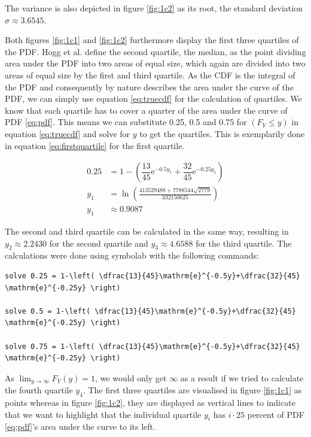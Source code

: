The variance is also depicted in figure \eqref{fig:1c2}     as its root, the standard deviation $\sigma \approx 3.6545$. 

Both figures \eqref{fig:1c1} and \eqref{fig:1c2} furthermore display the first three quartiles of the PDF. Hogg et al. \cite[Chapter~1.7.1]{hogg} define the second quartile, the median, as the point dividing area under the PDF into two areas of equal size, which again are divided into two areas of equal size by the first and third quartile. As the CDF is the integral of the PDF and consequently by nature describes the area under the curve of the PDF, we can simply use equation \eqref{eq:truecdf} for the calculation of quartiles. We know that each quartile has to cover a quarter of the area under the curve of PDF \eqref{eq:pdf}. This means we can substitute 0.25, 0.5 and 0.75 for $(F_Y \leq y)$ in equation \eqref{eq:truecdf} and solve for $y$ to get the quartiles. This is exemplarily done in equation \eqref{eq:firstquartile} for the first quartile.

\begin{equation}
\begin{split}
0.25 &
=1-\left( \dfrac{13}{45}\mathrm{e}^{-0.5y_1} + \dfrac{32}{45}\mathrm{e}^{-0.25y_1} \right)\\
y_1&=\ln \left(\frac{413529488+7788544\sqrt{2779}}{332150625}\right)\\
y_1 &\approx 0.9087 
\end{split}
\label{eq:firstquartile}
\end{equation}

The second and third quartile can be calculated in the same way, resulting in $y_2 \approx 2.2430$ for the second quartile and $y_3 \approx 4.6588$ for the third quartile. The calculations were done using symbolab \cite{symbolab} with the following commands:
\begin{lstlisting}
solve 0.25 = 1-\left( \dfrac{13}{45}\mathrm{e}^{-0.5y}+\dfrac{32}{45}
\mathrm{e}^{-0.25y} \right)

solve 0.5 = 1-\left( \dfrac{13}{45}\mathrm{e}^{-0.5y}+\dfrac{32}{45}
\mathrm{e}^{-0.25y} \right)

solve 0.75 = 1-\left( \dfrac{13}{45}\mathrm{e}^{-0.5y}+\dfrac{32}{45}
\mathrm{e}^{-0.25y} \right)
\end{lstlisting}

As $\lim_{y\to\infty} F_Y(y)= 1$, we would only get $\infty$ as a result if we tried to calculate the fourth quartile $y_4$. The first three quartiles are visualised in figure \eqref{fig:1c1} as points whereas in figure \eqref{fig:1c2}, they are displayed as vertical lines to indicate that we want to highlight that the individual quartile $y_i$ has $i\cdot25$ percent of PDF \eqref{eq:pdf}'s area under the curve to its left. 

